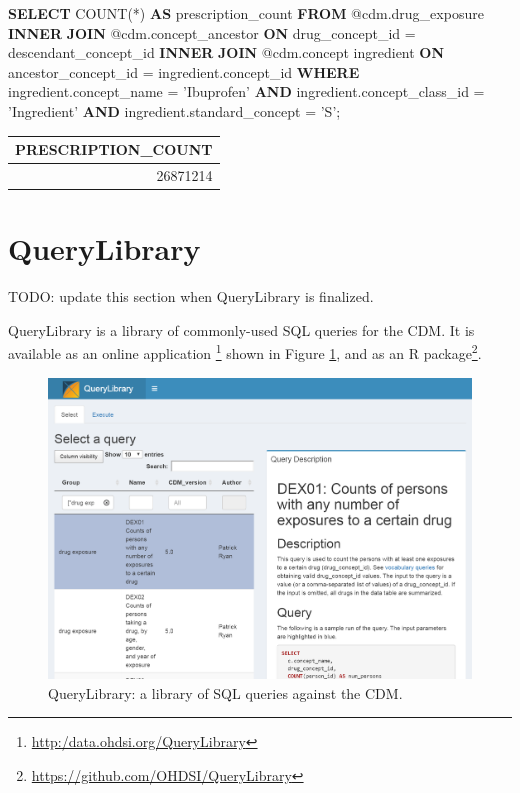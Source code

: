 \documentclass[11pt]{book}
\newenvironment{Shaded}{\begin{snugshade}}{\end{snugshade}}
\newcommand{\KeywordTok}[1]{\textcolor[rgb]{0.13,0.29,0.53}{\textbf{#1}}}
\newcommand{\StringTok}[1]{\textcolor[rgb]{0.31,0.60,0.02}{#1}}
\newcommand{\FunctionTok}[1]{\textcolor[rgb]{0.00,0.00,0.00}{#1}}
\newcommand{\NormalTok}[1]{#1}
\let\rmarkdownfootnote\footnote%
\def\footnote{\protect\rmarkdownfootnote}
\begin{document}
\begin{Shaded}
\begin{Highlighting}[]
\KeywordTok{SELECT} \FunctionTok{COUNT}\NormalTok{(*) }\KeywordTok{AS}\NormalTok{ prescription_count}
\KeywordTok{FROM}\NormalTok{ @cdm.drug_exposure}
\KeywordTok{INNER} \KeywordTok{JOIN}\NormalTok{ @cdm.concept_ancestor}
  \KeywordTok{ON}\NormalTok{ drug_concept_id = descendant_concept_id}
\KeywordTok{INNER} \KeywordTok{JOIN}\NormalTok{ @cdm.concept ingredient}
  \KeywordTok{ON}\NormalTok{ ancestor_concept_id = ingredient.concept_id}
\KeywordTok{WHERE}\NormalTok{ ingredient.concept_name = }\StringTok{'Ibuprofen'}
  \KeywordTok{AND}\NormalTok{ ingredient.concept_class_id = }\StringTok{'Ingredient'}
  \KeywordTok{AND}\NormalTok{ ingredient.standard_concept = }\StringTok{'S'}\NormalTok{;}
\end{Highlighting}
\end{Shaded}

\begin{longtable}[]{@{}r@{}}
\toprule
PRESCRIPTION\_COUNT\tabularnewline
\midrule
\endhead
26871214\tabularnewline
\bottomrule
\end{longtable}

\section{QueryLibrary}\label{querylibrary}

TODO: update this section when QueryLibrary is finalized.

QueryLibrary is a library of commonly-used SQL queries for the CDM. It
is available as an online application \footnote{\url{http:/data.ohdsi.org/QueryLibrary}}
shown in Figure \ref{fig:queryLibrary}, and as an R package\footnote{\url{https://github.com/OHDSI/QueryLibrary}}.

\begin{figure}

{\centering \includegraphics[width=1\linewidth]{images/SqlAndR/queryLibrary} 

}

\caption{QueryLibrary: a library of SQL queries against the CDM.}\label{fig:queryLibrary}
\end{figure}
\end{document}

